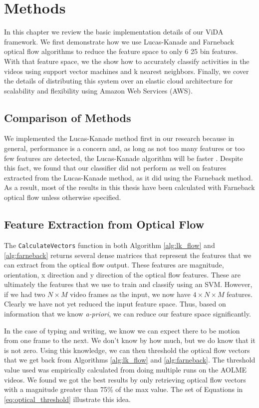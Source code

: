 \chapter{Methods}
In this chapter we review the basic implementation details of our ViDA framework.
We first demonstrate how we use Lucas-Kanade and Farneback optical flow algorithms
to reduce the feature space to only 6 25 bin features. With that feature space,
we the show how to accurately classify activities in the videos using support
vector machines and k nearest neighbors. Finally, we cover the details of distributing
this system over an elastic cloud architecture for scalability and flexibility
using Amazon Web Services (AWS).


\section{\label{subsection:comparison}Comparison of Methods}
We implemented the Lucas-Kanade method first in our research because in general,
performance is a concern and, as long as not too many features or
too few features are detected, the Lucas-Kanade algorithm will be faster
\cite{de2015choosing}. Despite this fact, we found that our classifier did
not perform as well on features extracted from the Lucas-Kanade method, as it
did using the Farneback method. As a result, most of the results in this thesis
have been calculated with Farneback optical flow unless otherwise specified.

\section{\label{section:feature_extraction}Feature Extraction from Optical Flow}
The \texttt{CalculateVectors} function in both Algorithm \ref{alg:lk_flow} and
\ref{alg:farneback} returns several dense matrices that represent the features
that we can extract from the optical flow output. These features are magnitude,
orientation, x direction and y direction of the optical flow features. These
are ultimately the features that we use to train and classify using an SVM. However,
if we had two $N \times M$ video frames as the input, we now have $4 \times N \times M$
features. Clearly we have not yet reduced the input feature space. Thus, based
on information that we know \textit{a-priori}, we can reduce our feature space
significantly.

In the case of typing and writing, we know we can expect there to be motion from
one frame to the next. We don't know by how much, but we do know that it is not
zero. Using this knowledge, we can then threshold the optical flow vectors that
we get back from Algorithms \ref{alg:lk_flow} and \ref{alg:farneback}. The
threshold value used was empirically calculated from doing multiple runs on the
AOLME videos. We found we got the best results by only retrieving
optical flow vectors with a magnitude greater than 75\% of the max value. The set
of Equations in \ref{eq:optical_threshold} illustrate this idea.

